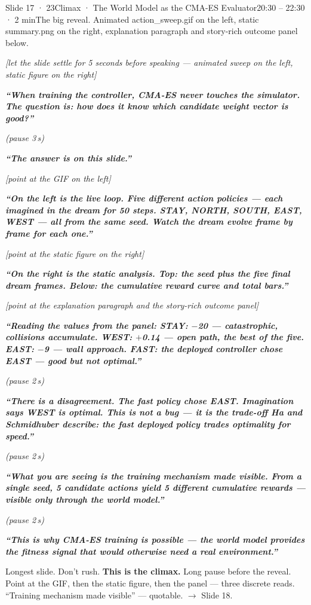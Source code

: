 \documentclass[11pt,a4paper]{article}
\newcommand{\say}[1]{%
    \par\vspace{0.3em}%
    \begingroup
    \leftskip=12pt
    \rightskip=8pt
    \color{thStrong}%
    \itshape\textbf{“#1”}%
    \par
    \endgroup
    \vspace{0.2em}
}
\newcommand{\beat}[1][2]{%
    \par\textcolor{thMuted}{\small\textit{(pause #1\,s)}}\par
    \vspace{0.2em}
}
\newcommand{\stage}[1]{%
    \par\textcolor{thMuted}{\small\textit{[#1]}}\par
    \vspace{0.2em}
}
\newcommand{\emphw}[1]{\textbf{\textcolor{thAmber}{#1}}}
\begin{document}
\begin{slide}{Slide 17 · 23}{Climax · The World Model as the CMA-ES Evaluator}{20:30 – 22:30 · 2 min}{The big reveal. Animated action\_sweep.gif on the left, static summary.png on the right, explanation paragraph and story-rich outcome panel below.}
\stage{let the slide settle for 5 seconds before speaking — animated sweep on the left, static figure on the right}

\say{When training the controller, \emphw{CMA-ES never touches the simulator}. The question is: \textbf{how does it know which candidate weight vector is good?}}
\beat[3]
\say{The answer is on this slide.}

\stage{point at the GIF on the left}

\say{On the \textbf{left} is the live loop. Five different action policies — each imagined in the dream for 50 steps. STAY, NORTH, SOUTH, EAST, WEST — all from the \textbf{same seed}. Watch the dream evolve frame by frame for each one.}

\stage{point at the static figure on the right}

\say{On the \textbf{right} is the static analysis. Top: the seed plus the five final dream frames. Below: the cumulative reward curve and total bars.}

\stage{point at the explanation paragraph and the story-rich outcome panel}

\say{Reading the values from the panel: \textbf{STAY: $-$20} — catastrophic, collisions accumulate. \textbf{WEST: $+$0.14} — open path, the best of the five. \textbf{EAST: $-$9} — wall approach. \textbf{FAST}: the deployed controller chose \textbf{EAST} — good but not optimal.}
\beat
\say{There is a \emphw{disagreement}. The fast policy chose EAST. Imagination says WEST is optimal. \textbf{This is not a bug} — it is the trade-off Ha and Schmidhuber describe: the fast deployed policy trades optimality for speed.}
\beat
\say{What you are seeing is the \emphw{training mechanism made visible}. From a single seed, 5 candidate actions yield 5 different cumulative rewards — \textbf{visible only through the world model}.}
\beat
\say{This is \textbf{why CMA-ES training is possible} — the world model provides the fitness signal that would otherwise need a real environment.}

\begin{stagebox}
Longest slide. Don't rush. \textbf{This is the climax.} Long pause before the reveal. Point at the GIF, then the static figure, then the panel — three discrete reads. ``Training mechanism made visible'' — quotable. $\rightarrow$ Slide 18.
\end{stagebox}
\end{slide}
\end{document}
